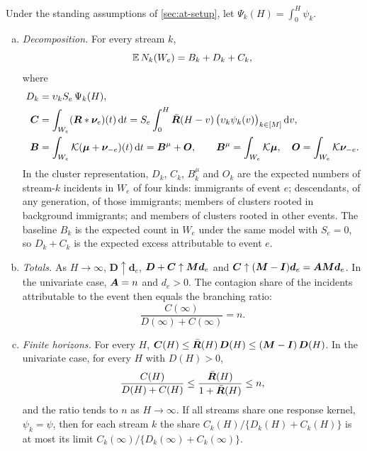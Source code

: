 \begin{theorem}\label{thm:attribution}
Under the standing assumptions of \cref{sec:at-setup}, let
$\Psi_k(H)=\int_0^H\psi_k$.
\begin{enumerate}[(a)]
  \item \emph{Decomposition.} For every stream $k$,
  \begin{equation}\label{eq:at-decomp}
    \mathbb{E}\,N_k(W_e)=B_k+D_k+C_k ,
  \end{equation}
  where
  \begin{align}
    D_k&=\upsilon_kS_e\,\Psi_k(H),\label{eq:at-D}\\
    \bm C&=\int_{W_e}(\bm{R}*\bm\nu_e)(t)\,\mathrm{d} t
      =S_e\int_0^H\bar{\bm{R}}(H-v)\,\bigl(\upsilon_k\psi_k(v)\bigr)_{k\in[M]}\,\mathrm{d} v,\label{eq:at-C}\\
    \bm B&=\int_{W_e}\mathcal K(\bm\mu+\bm\nu_{-e})(t)\,\mathrm{d} t=\bm B^{\mu}+\bm O,
    \qquad \bm B^{\mu}=\int_{W_e}\mathcal K\bm\mu,\quad \bm O=\int_{W_e}\mathcal K\bm\nu_{-e}.\label{eq:at-B}
  \end{align}
  In the cluster representation, $D_k$, $C_k$, $B^{\mu}_k$ and $O_k$ are the
  expected numbers of stream-$k$ incidents in $W_e$ of four kinds: immigrants of event
  $e$; descendants, of any generation, of those immigrants; members of clusters rooted
  in background immigrants; and members of clusters rooted in other events. The
  baseline $B_k$ is the expected count in $W_e$ under the same model with $S_e=0$, so
  $D_k+C_k$ is the expected excess attributable to event $e$.
  \item \emph{Totals.} As $H\to\infty$, $\bm D\uparrow\bm d_e$,
  $\bm D+\bm C\uparrow\bm{M}\bm d_e$ and $\bm C\uparrow(\bm{M}-\bm{I})\bm d_e=\bm{A}\bm{M}\bm d_e$.
  In the univariate case, $\bm{A}=n$ and $d_e>0$. The contagion share of the incidents
  attributable to the event then equals the branching ratio:
  \begin{equation}\label{eq:at-share-n}
    \frac{C(\infty)}{D(\infty)+C(\infty)}=n .
  \end{equation}
  \item \emph{Finite horizons.} For every $H$,
  $\bm C(H)\le\bar{\bm{R}}(H)\,\bm D(H)\le(\bm{M}-\bm{I})\,\bm D(H)$. In the univariate case,
  for every $H$ with $D(H)>0$,
  \[
  \frac{C(H)}{D(H)+C(H)}\le\frac{\bar{\bm{R}}(H)}{1+\bar{\bm{R}}(H)}\le n,
  \]
  and the ratio tends to $n$ as $H\to\infty$. If all streams share one response kernel,
  $\psi_k=\psi$, then for each stream $k$ the share
  $C_k(H)/\{D_k(H)+C_k(H)\}$ is at most its limit $C_k(\infty)/\{D_k(\infty)+C_k(\infty)\}$.

\end{enumerate}
\end{theorem}

